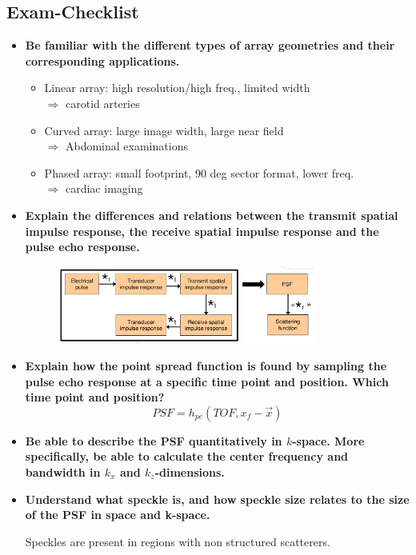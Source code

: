 \documentclass[10pt,a4paper,noendnumber=true]{scrartcl}
\begin{document}
\subsection{Exam-Checklist}
\begin{itemize}
\item \textbf{Be familiar with the different types of array geometries and their corresponding applications.}

\begin{itemize}
\item Linear array: high resolution/high freq., limited width 
	\\$\Rightarrow$ carotid arteries
\item Curved array: large image width, large near field
	\\$\Rightarrow$ Abdominal examinations
\item Phased array: small footprint, 90 deg sector format, lower freq.
	\\$\Rightarrow$ cardiac imaging
\end{itemize}

\item \textbf{Explain the differences and relations between the transmit spatial impulse response, the receive spatial impulse response and the pulse echo response.}

\begin{figure}[H]
\centering
\includegraphics[width=0.8\textwidth]{img/psf.png}
\end{figure}

\item \textbf{Explain how the point spread function is found by sampling the pulse echo response at a specific time point and position. Which time point and position?}
\begin{equation}
PSF=h_{pe}(TOF,x_f-\vec{x})
\end{equation}


\item \textbf{Be able to describe the PSF quantitatively in $k$-space. More specifically, be able to calculate the center frequency and bandwidth in $k_x$ and $k_z$-dimensions.}



\item \textbf{Understand what speckle is, and how speckle size relates to the size of the PSF in space and k-space.}

Speckles are present in regions with non structured scatterers.


\end{itemize}
\end{document}
